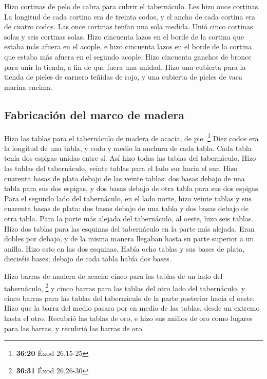  Hizo cortinas de pelo de cabra para cubrir el
tabernáculo. Les hizo once cortinas.  La longitud de cada
cortina era de treinta codos, y el ancho de cada cortina era de cuatro
codos. Las once cortinas tenían una sola medida.  Unió
cinco cortinas solas y seis cortinas solas.  Hizo
cincuenta lazos en el borde de la cortina que estaba más afuera en el
acople, e hizo cincuenta lazos en el borde de la cortina que estaba más
afuera en el segundo acople.  Hizo cincuenta ganchos de
bronce para unir la tienda, a fin de que fuera una unidad.
 Hizo una cubierta para la tienda de pieles de carnero
teñidas de rojo, y una cubierta de pieles de vaca marina encima.

\hypertarget{fabricaciuxf3n-del-marco-de-madera}{%
\subsection{Fabricación del marco de
madera}\label{fabricaciuxf3n-del-marco-de-madera}}

 Hizo las tablas para el tabernáculo de madera de acacia,
de pie. \footnote{\textbf{36:20} Éxod 26,15-25}  Diez
codos era la longitud de una tabla, y codo y medio la anchura de cada
tabla.  Cada tabla tenía dos espigas unidas entre sí. Así
hizo todas las tablas del tabernáculo.  Hizo las tablas
del tabernáculo, veinte tablas para el lado sur hacia el sur.
 Hizo cuarenta basas de plata debajo de las veinte
tablas: dos basas debajo de una tabla para sus dos espigas, y dos basas
debajo de otra tabla para sus dos espigas.  Para el
segundo lado del tabernáculo, en el lado norte, hizo veinte tablas
 y sus cuarenta basas de plata: dos basas debajo de una
tabla y dos basas debajo de otra tabla.  Para la parte
más alejada del tabernáculo, al oeste, hizo seis tablas. 
Hizo dos tablas para las esquinas del tabernáculo en la parte más
alejada.  Eran dobles por debajo, y de la misma manera
llegaban hasta su parte superior a un anillo. Hizo esto en las dos
esquinas.  Había ocho tablas y sus bases de plata,
dieciséis bases; debajo de cada tabla había dos bases.

 Hizo barras de madera de acacia: cinco para las tablas
de un lado del tabernáculo, \footnote{\textbf{36:31} Éxod 26,26-30}
 y cinco barras para las tablas del otro lado del
tabernáculo, y cinco barras para las tablas del tabernáculo de la parte
posterior hacia el oeste.  Hizo que la barra del medio
pasara por en medio de las tablas, desde un extremo hasta el otro.
 Recubrió las tablas de oro, e hizo sus anillos de oro
como lugares para las barras, y recubrió las barras de oro.

